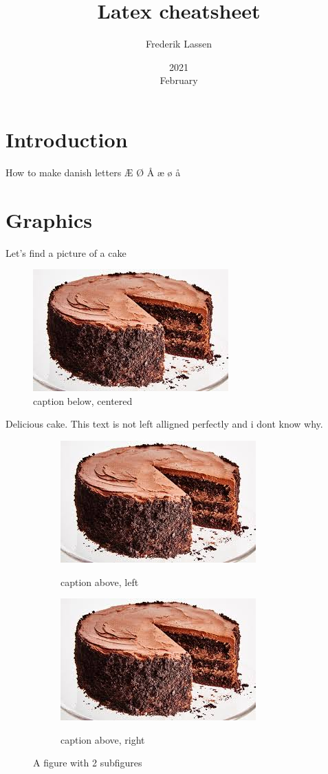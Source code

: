 \documentclass[a4paper,12pt]{article}
\title{Latex cheatsheet}
\date{2021\\February}
\author{Frederik Lassen}
\begin{document}
\maketitle
\thispagestyle{empty}
\clearpage
{}

\tableofcontents
\clearpage

\section{Introduction}
How to make danish letters
Æ Ø Å æ ø å
\section{Graphics}
\label{sec:graphics}
Let's find a picture of a cake
{
\begin{figure}[H]
	\centering
	\captionsetup{justification=centering}
	\includegraphics[scale=0.5]{cake}
	\caption{caption below, centered}
	\label{fig:cake1}
\end{figure}
}
Delicious cake. This text is not left alligned perfectly and i dont know why.
{
\begin{figure}[H]
	\centering
\begin{subfigure}{.5\textwidth}
	\centering
	\caption{caption above, left}
	\includegraphics[width=.4\linewidth]{cake}
	\label{fig:cake2}
\end{subfigure}%
\begin{subfigure}{.5\textwidth}
	\centering
	\caption{caption above, right}
	\includegraphics[width=.4\linewidth]{cake}
	\label{fig:cake3}
\end{subfigure}%
\caption{A figure with 2 subfigures}
\label{fig:double}
\end{figure}
}
\end{document}
